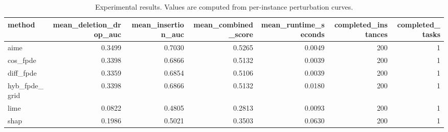 \begin{table}[t]
\caption{Experimental results. Values are computed from per-instance perturbation curves.}
\label{tab:main_results_computed}
\centering
\begin{tabular}{lrrrrrr}
\toprule
method & mean\_deletion\_drop\_auc & mean\_insertion\_auc & mean\_combined\_score & mean\_runtime\_seconds & completed\_instances & completed\_tasks \\
\midrule
aime & 0.3499 & 0.7030 & 0.5265 & 0.0049 & 200 & 1 \\
cos\_fpde & 0.3398 & 0.6866 & 0.5132 & 0.0039 & 200 & 1 \\
diff\_fpde & 0.3359 & 0.6854 & 0.5106 & 0.0039 & 200 & 1 \\
hyb\_fpde\_grid & 0.3398 & 0.6866 & 0.5132 & 0.0180 & 200 & 1 \\
lime & 0.0822 & 0.4805 & 0.2813 & 0.0093 & 200 & 1 \\
shap & 0.1986 & 0.5021 & 0.3503 & 0.0630 & 200 & 1 \\
\bottomrule
\end{tabular}

\end{table}
